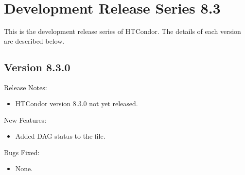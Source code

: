 
\section{\label{sec:History-8-3}Development Release Series 8.3}

This is the development release series of HTCondor.
The details of each version are described below.

\subsection*{\label{sec:New-8-3-0}Version 8.3.0}

\noindent Release Notes:

\begin{itemize}

\item HTCondor version 8.3.0 not yet released.

\end{itemize}


\noindent New Features:

\begin{itemize}

\item Added DAG status to the  file.

\end{itemize}

\noindent Bugs Fixed:

\begin{itemize}

\item None.

\end{itemize}

